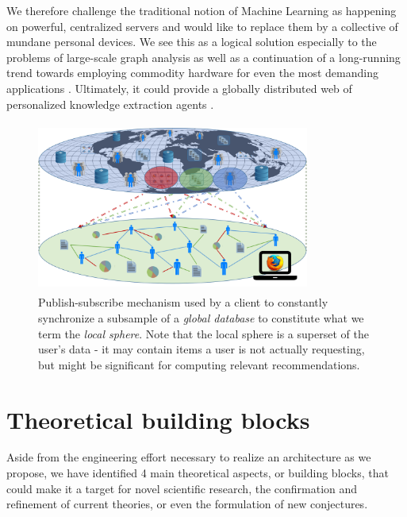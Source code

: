 \documentclass{llncs}
\begin{document}
We therefore challenge the traditional notion of Machine Learning as happening on powerful, centralized servers and would like to replace them by a collective of mundane personal devices. We see this as a logical solution especially to the problems of large-scale graph analysis \cite{leskovec2006samplinggraphs} as well as a continuation of a long-running trend towards employing commodity hardware for even the most demanding applications \cite{al2008scalable}. Ultimately, it could provide a globally distributed web of personalized knowledge extraction agents \cite{Holzinger:2017:InauguralMAKE}.

\vspace*{-0.3cm}
\begin{figure}[H]
	\begin{center}
		\includegraphics[width=0.8\textwidth, height=5.6cm]{figures/local_sphere}
		\caption{Publish-subscribe mechanism used by a client to constantly synchronize a subsample of a \textit{global database} to constitute what we term the \textit{local sphere}. Note that the local sphere is a superset of the user's data - it may contain items a user is not actually requesting, but might be significant for computing relevant recommendations.}
		\label{fig:local_sphere}
	\end{center}
\end{figure}

\vspace*{-1.2cm}

\section{Theoretical building blocks}
\label{sect:bg_related}

Aside from the engineering effort necessary to realize an architecture as we propose, we have identified 4 main theoretical aspects, or building blocks, that could make it a target for novel scientific research, the confirmation and refinement of current theories, or even the formulation of new conjectures.
\end{document}
